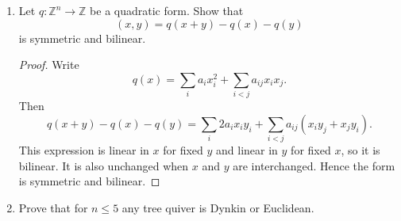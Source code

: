 \documentclass[11pt, a4paper]{article}
\begin{document}
\begin{enumerate}[leftmargin=*, label=\textbf{\arabic*.}]
\begin{proof}
Let the arrows be
\[
a:1\to2,
\qquad
b:2\to3,
\qquad
c:3\to2,
\qquad
d:2\to4.
\]
A point of $E_d$ is a quadruple
\[
(A,B,C,D)\in \operatorname{Mat}_{2\times2}(k)\oplus \operatorname{Mat}_{1\times2}(k)
\oplus \operatorname{Mat}_{2\times1}(k)\oplus \operatorname{Mat}_{1\times2}(k).
\]
Because the quiver contains the oriented two-cycle $2\rightleftarrows3$, the orbit decomposition is not finite. Indeed, consider the family
\[
A=0,
\qquad
D=0,
\qquad
C=\begin{pmatrix}1\\0\end{pmatrix},
\qquad
B_\lambda=\begin{pmatrix}\lambda&0\end{pmatrix},
\qquad \lambda\in k.
\]
For such a representation,
\[
B_\lambda C=\lambda\in \operatorname{End}(k).
\]
Under base change, $B$ and $C$ transform as
\[
B\mapsto g_3Bg_2^{-1},
\qquad
C\mapsto g_2Cg_3^{-1},
\]
so the scalar $BC$ is invariant:
\[
(g_3Bg_2^{-1})(g_2Cg_3^{-1})=g_3(BC)g_3^{-1}=BC.
\]
Therefore the representations corresponding to distinct $\lambda$ lie in distinct $G_d$-orbits.
Hence $E_d$ contains the disjoint union
\[
\bigsqcup_{\lambda\in k}\mathcal O_\lambda,
\]
where $\mathcal O_\lambda$ is the orbit of $(0,B_\lambda,C,0)$. In particular, unlike the Dynkin cases, $E_d$ has infinitely many orbits. Thus no finite orbit decomposition exists; the orbit decomposition is an infinite one, already containing the one-parameter family above.
\end{proof}

\item Let $q:\mathbb Z^n\to\mathbb Z$ be a quadratic form. Show that
\[
(x,y)=q(x+y)-q(x)-q(y)
\]
is symmetric and bilinear.

\begin{proof}
Write
\[
q(x)=\sum_i a_i x_i^2+\sum_{i<j}a_{ij}x_ix_j.
\]
Then
\[
q(x+y)-q(x)-q(y)
=\sum_i2a_ix_iy_i+\sum_{i<j}a_{ij}(x_iy_j+x_jy_i).
\]
This expression is linear in $x$ for fixed $y$ and linear in $y$ for fixed $x$, so it is bilinear. It is also unchanged when $x$ and $y$ are interchanged. Hence the form is symmetric and bilinear.
\end{proof}

\item Prove that for $n\le 5$ any tree quiver is Dynkin or Euclidean.


\end{enumerate}
\end{document}
